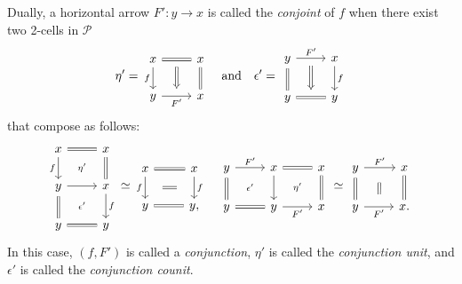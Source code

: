 \documentclass[a4paper, 11pt]{amsart}
\numberwithin{theorem}{section}
\theoremstyle{definition}
\renewcommand{\P}{\mathscr{P}}
\begin{document}
\begin{definition}
	
	Dually, a horizontal arrow $F':y\rightarrow x$ is called the \textit{conjoint} of $f$ 
	when there exist two 2-cells in $\P$
	\[
		\eta' = \begin{tikzcd}
			x\arrow[d, "f"' ] \arrow[r, equal, ""name=f] & x\arrow[d, equal] \\
			y \arrow[r, "F'"'name=t] & x
			\arrow[from=f,to=t,Rightarrow, shorten <= 6pt, shorten >= 6pt]
		\end{tikzcd} 
		\quad 
		\text{and}
		\quad
		\epsilon' = \begin{tikzcd}
			y \arrow[r, "F'"name=f]\arrow[d, equal] & x \arrow[d, "f"] \\
			y \arrow[r, equal, ""'name=t] & y
			\arrow[from=f,to=t,Rightarrow, shorten <= 6pt, shorten >= 6pt]
		\end{tikzcd}
	\] 
	that compose as follows:
	\[
		\begin{tikzcd}
			x\arrow[d, "f"'] \arrow[r, equal, ""'name=h1] & x\arrow[d, equal] \\
			y \arrow[d,equal ]\arrow[r, ""name=h2] & x \arrow[d, "f"] \\
			y \arrow[r, equal, ""'name=h3] & y
			\arrow[from=h1, to=h2, phantom, "\scriptstyle\eta'"]
			\arrow[from=h2, to=h3, phantom, "\scriptstyle\epsilon'"]
		\end{tikzcd}
		\simeq
		\begin{tikzcd}
			x\arrow[r,equal] \arrow[d, "f"'name=t1] & x \arrow[d, "f"name=f1] \\
			y \arrow[r, equal]  & y,
			\arrow[from=f1, to=t1, equal, shorten <= 14pt, shorten >= 14pt]
		\end{tikzcd}
		\quad 
		\begin{tikzcd}
			y \arrow[r, "F'"name=h1]\arrow[d, equal] & x \arrow[d] \arrow[r, equal, ""name=h3] & x\arrow[d, equal] \\
			y \arrow[r, equal, ""'name=h2] & y \arrow[r,"F'"'name=h4] & x
			\arrow[from=h1, to=h2, phantom, "\scriptstyle\epsilon'"]
			\arrow[from=h3, to=h4, phantom, "\scriptstyle\eta'"]
		\end{tikzcd}
		\simeq
		\begin{tikzcd}
			y\arrow[d,equal] \arrow[r, "F'"name=f1] & x \arrow[d,equal] \\
			y \arrow[r, "F'"'name=t1] & x.
			\arrow[from=f1, to=t1, equal, shorten <= 12pt, shorten >= 10pt]
		\end{tikzcd}
	\]
	In this case, $(f,F')$ is called a \textit{conjunction}, $\eta'$ is called the \textit{conjunction unit}, and $\epsilon'$ is called the 
	\textit{conjunction counit}.
\end{definition}
\end{document}
